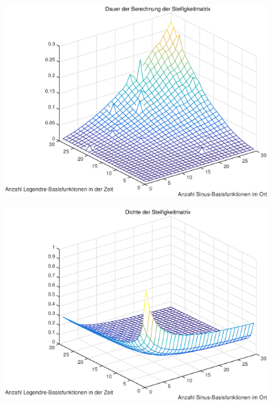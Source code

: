 \begin{figure}[tb]
    \begin{center}
        \includegraphics[width=0.9\textwidth]{figures/oned/times.pdf}
    \end{center}
\end{figure}

\begin{figure}[tb]
    \begin{center}
        \includegraphics[width=0.9\textwidth]{figures/oned/density.pdf}
    \end{center}
\end{figure}

